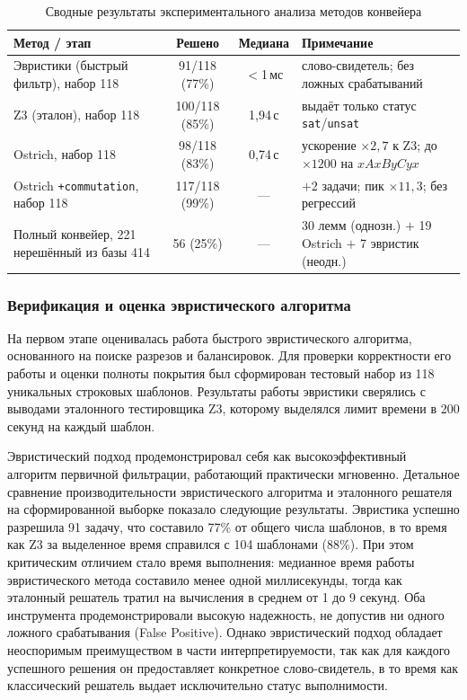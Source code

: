 \documentclass[14pt, russian]{scrartcl}
\begin{document}
\begin{table}[h!]
\caption{Сводные результаты экспериментального анализа методов конвейера}
\label{tab:summary}
\small
\begin{tabularx}{\textwidth}{|>{\raggedright\arraybackslash}p{42mm}|c|c|X|}
\hline
Метод / этап & Решено & Медиана & Примечание \\
\hline
Эвристики (быстрый фильтр), набор 118 & 91/118 (77\%) & $<$1\,мс &
  слово-свидетель; без ложных срабатываний \\
\hline
Z3 (эталон), набор 118 & 100/118 (85\%) & 1,94\,с &
  выдаёт только статус \texttt{sat}/\texttt{unsat} \\
\hline
Ostrich, набор 118 & 98/118 (83\%) & 0,74\,с &
  ускорение $\times2{,}7$ к Z3; до $\times1200$ на $xAxByCyx$ \\
\hline
Ostrich \texttt{+commutation}, набор 118 & 117/118 (99\%) & --- &
  $+2$ задачи; пик $\times11{,}3$; без регрессий \\
\hline
Полный конвейер, 221 нерешённый из базы 414 & 56 (25\%) & --- &
  30 лемм (однозн.) $+$ 19 Ostrich $+$ 7 эвристик (неодн.) \\
\hline
\end{tabularx}
\end{table}

\subsubsection{Верификация и оценка эвристического алгоритма}

На первом этапе оценивалась работа быстрого эвристического алгоритма, основанного на поиске разрезов и балансировок. Для проверки корректности его работы и оценки полноты покрытия был сформирован тестовый набор из 118 уникальных строковых шаблонов. Результаты работы эвристики сверялись с выводами эталонного тестировщика Z3, которому выделялся лимит времени в 200 секунд на каждый шаблон.

Эвристический подход продемонстрировал себя как высокоэффективный алгоритм первичной фильтрации, работающий практически мгновенно. Детальное сравнение производительности эвристического алгоритма и эталонного решателя на сформированной выборке показало следующие результаты. Эвристика успешно разрешила 91 задачу, что составило 77\% от общего числа шаблонов, в то время как Z3 за выделенное время справился с 104 шаблонами (88\%). При этом критическим отличием стало время выполнения: медианное время работы эвристического метода составило менее одной миллисекунды, тогда как эталонный решатель тратил на вычисления в среднем от 1 до 9 секунд. Оба инструмента продемонстрировали высокую надежность, не допустив ни одного ложного срабатывания (False Positive). Однако эвристический подход обладает неоспоримым преимуществом в части интерпретируемости, так как для каждого успешного решения он предоставляет конкретное слово-свидетель, в то время как классический решатель выдает исключительно статус выполнимости.
\end{document}
